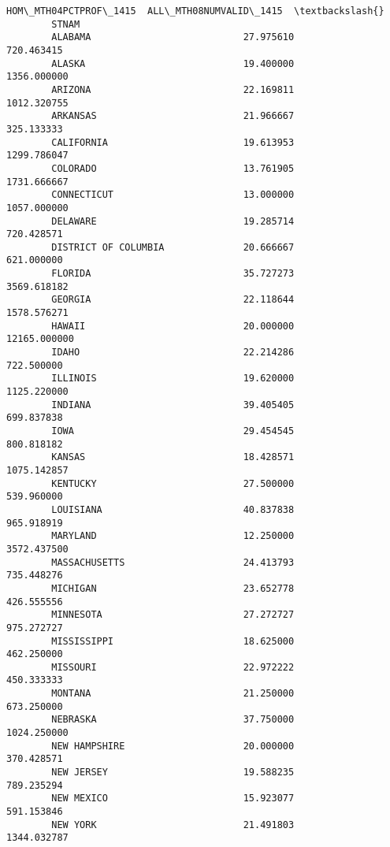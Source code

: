 \documentclass[11pt]{article}
\begin{document}
\begin{Verbatim}[commandchars=\\\{\}]
                              HOM\_MTH04PCTPROF\_1415  ALL\_MTH08NUMVALID\_1415  \textbackslash{}
        STNAM                                                                 
        ALABAMA                           27.975610              720.463415   
        ALASKA                            19.400000             1356.000000   
        ARIZONA                           22.169811             1012.320755   
        ARKANSAS                          21.966667              325.133333   
        CALIFORNIA                        19.613953             1299.786047   
        COLORADO                          13.761905             1731.666667   
        CONNECTICUT                       13.000000             1057.000000   
        DELAWARE                          19.285714              720.428571   
        DISTRICT OF COLUMBIA              20.666667              621.000000   
        FLORIDA                           35.727273             3569.618182   
        GEORGIA                           22.118644             1578.576271   
        HAWAII                            20.000000            12165.000000   
        IDAHO                             22.214286              722.500000   
        ILLINOIS                          19.620000             1125.220000   
        INDIANA                           39.405405              699.837838   
        IOWA                              29.454545              800.818182   
        KANSAS                            18.428571             1075.142857   
        KENTUCKY                          27.500000              539.960000   
        LOUISIANA                         40.837838              965.918919   
        MARYLAND                          12.250000             3572.437500   
        MASSACHUSETTS                     24.413793              735.448276   
        MICHIGAN                          23.652778              426.555556   
        MINNESOTA                         27.272727              975.272727   
        MISSISSIPPI                       18.625000              462.250000   
        MISSOURI                          22.972222              450.333333   
        MONTANA                           21.250000              673.250000   
        NEBRASKA                          37.750000             1024.250000   
        NEW HAMPSHIRE                     20.000000              370.428571   
        NEW JERSEY                        19.588235              789.235294   
        NEW MEXICO                        15.923077              591.153846   
        NEW YORK                          21.491803             1344.032787   

\end{Verbatim}
\end{document}
